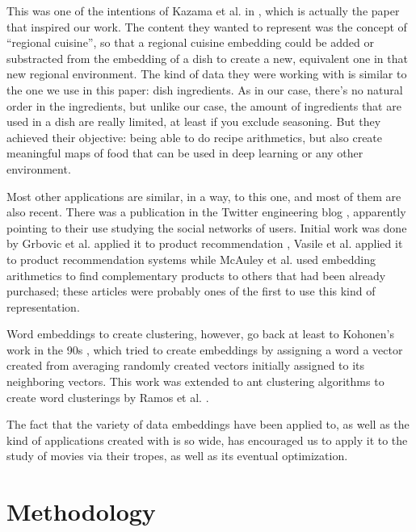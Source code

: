 \documentclass[letterpaper]{article}
\begin{document}
	This was one of the intentions of Kazama et al. in
	\cite{kazama2018}, which is actually the paper that inspired
	our work. The content they wanted to represent was the concept
	of ``regional cuisine'', so that a regional cuisine embedding
	could be added or substracted from the embedding of a dish to
	create a new, equivalent one in that new regional
	environment. The kind of data they were working with is
	similar to the one we use in this paper: dish ingredients. As
	in our case, there's no natural order in the ingredients, but
	unlike our case, the amount of ingredients that are used in a
	dish are really limited, at least if you exclude
	seasoning. But they achieved their objective: being able to do
	recipe arithmetics, but also create meaningful maps of food
	that can be used in deep learning or any other environment.
	
	Most other applications are similar, in a way, to this one,
	and most of them are also recent. There was a publication in
	the Twitter engineering blog \cite{twitter:embeddings},
	apparently pointing to their use studying the social networks
	of users. Initial work was done by Grbovic et al. applied it to product recommendation
	\cite{Grbovic2015}, Vasile et al. applied it to product
	recommendation systems \cite{vasile2016} while McAuley et
	al. \cite{DBLP:journals/corr/McAuleyPL15} used embedding
	arithmetics to find complementary products to others that had
	been already purchased; these articles were
	probably ones of the first to use this kind of
	representation.
	
	Word embeddings to create clustering, however, go back at
	least to Kohonen's work in the 90s
	\cite{kohonen1997exploration}, which tried to create
	embeddings by assigning a word a vector created from averaging
	randomly created vectors initially assigned to its neighboring
	vectors. This work was extended to ant clustering algorithms
	to create word clusterings by Ramos et
	al. \cite{DBLP:journals/corr/abs-cs-0412075}.
	
	The fact that the variety of data embeddings have been applied
	to, as well as the kind of applications created with is so
	wide, has encouraged us to apply it to the study of movies via
	their tropes, as well as its eventual optimization.
	
	\section{Methodology}
	\label{sec:met}
	
\end{document}
